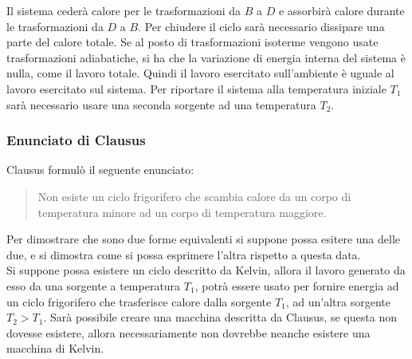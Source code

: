 \documentclass{article}
\numberwithin{equation}{subsection}
\begin{document}
Il sistema cederà calore per le trasformazioni da $B$ a $D$ e 
assorbirà calore durante le trasformazioni da $D$ a $B$. 
Per chiudere il ciclo sarà necessario dissipare una parte del 
calore totale. Se al posto di trasformazioni isoterme vengono 
usate trasformazioni adiabatiche, si ha che la variazione 
di energia interna del sistema è nulla, come il lavoro totale. 
Quindi il lavoro esercitato sull'ambiente è uguale al lavoro 
esercitato sul sistema. Per riportare il sistema alla temperatura 
iniziale $T_1$ sarà necessario usare una seconda sorgente ad 
una temperatura $T_2$. 

\subsubsection{Enunciato di Clausus}
Clausus formulò il seguente enunciato:
\begin{quotation}
    Non esiste un ciclo frigorifero che scambia calore da un corpo 
    di temperatura minore ad un corpo di temperatura maggiore.
\end{quotation}

\begin{center}\end{center}

Per dimostrare che sono due forme equivalenti si suppone possa esitere 
una delle due, e si dimostra come si possa esprimere l'altra rispetto a questa 
data. \\
Si suppone possa esistere un ciclo descritto da Kelvin, allora il lavoro 
generato da esso da una sorgente a temperatura $T_1$, potrà essere usato per 
fornire energia ad un ciclo frigorifero che trasferisce calore dalla 
sorgente $T_1$, ad un'altra sorgente $T_2>T_1$. Sarà possibile creare una 
macchina descritta da Clausus, se questa non dovesse esistere, allora 
necessariamente non dovrebbe neanche esistere una macchina di Kelvin.
\end{document}
